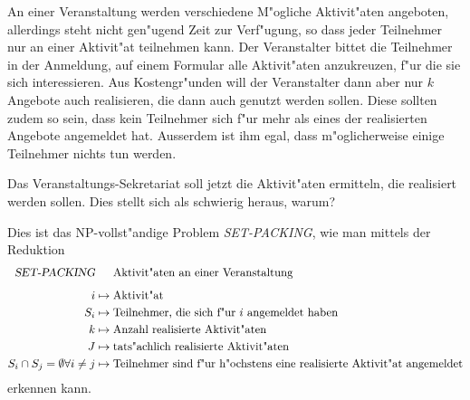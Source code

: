 An einer Veranstaltung werden verschiedene M"ogliche Aktivit"aten angeboten,
allerdings steht nicht gen"ugend Zeit zur Verf"ugung, so dass jeder
Teilnehmer nur an einer Aktivit"at teilnehmen kann.
Der Veranstalter bittet die Teilnehmer in der Anmeldung, auf einem
Formular alle Aktivit"aten anzukreuzen, f"ur die sie sich interessieren.
Aus Kostengr"unden will der Veranstalter dann aber nur $k$ Angebote
auch realisieren, die dann auch genutzt werden sollen.
Diese sollten zudem so sein, dass kein Teilnehmer sich f"ur mehr als
eines der realisierten Angebote angemeldet hat.
Ausserdem ist ihm egal, dass m"oglicherweise einige Teilnehmer nichts tun
werden.

Das Veranstaltungs-Sekretariat soll jetzt die Aktivit"aten ermitteln, 
die realisiert werden sollen.
Dies stellt sich als schwierig heraus, warum?

\begin{loesung}
Dies ist das NP-vollst"andige Problem \textsl{SET-PACKING}, wie man 
mittels der Reduktion
\begin{align*}
\textsl{SET-PACKING}&\phantom{\mathstrut\mapsto\mathstrut}\textrm{Aktivit"aten an einer Veranstaltung}
\\[5pt]
i&\mapsto \textrm{Aktivit"at}
\\
S_i&\mapsto \textrm{Teilnehmer, die sich f"ur $i$ angemeldet haben}
\\
k&\mapsto \textrm{Anzahl realisierte Aktivit"aten}
\\
J&\mapsto \textrm{tats"achlich realisierte Aktivit"aten}
\\
S_i\cap S_j=\emptyset\forall i\ne j
&\mapsto \textrm{Teilnehmer sind f"ur h"ochstens eine realisierte Aktivit"at angemeldet}
\end{align*}
erkennen kann.
\end{loesung}

\begin{bewertung}
\end{bewertung}

